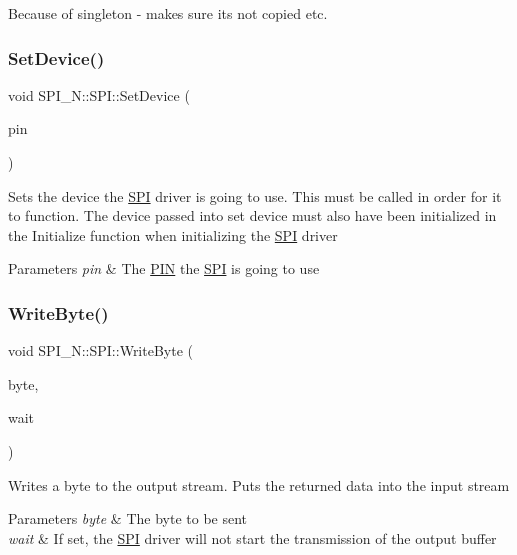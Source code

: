 Because of singleton -\/ makes sure its not copied etc. \hypertarget{class_s_p_i___n_1_1_s_p_i_a23f01675382512e51095ef1d6e257956}{}\label{class_s_p_i___n_1_1_s_p_i_a23f01675382512e51095ef1d6e257956} 
\subsubsection{\texorpdfstring{Set\+Device()}{SetDevice()}}
{\footnotesize\ttfamily void S\+P\+I\+\_\+\+N\+::\+S\+P\+I\+::\+Set\+Device (\begin{DoxyParamCaption}\item[{\hyperlink{struct_s_p_i___n_1_1_p_i_n}{P\+IN}}]{pin }\end{DoxyParamCaption})}

Sets the device the \hyperlink{class_s_p_i___n_1_1_s_p_i}{S\+PI} driver is going to use. This must be called in order for it to function. The device passed into set device must also have been initialized in the Initialize function when initializing the \hyperlink{class_s_p_i___n_1_1_s_p_i}{S\+PI} driver 
\begin{DoxyParams}{Parameters}
{\em pin} & The \hyperlink{struct_s_p_i___n_1_1_p_i_n}{P\+IN} the \hyperlink{class_s_p_i___n_1_1_s_p_i}{S\+PI} is going to use \\
\hline
\end{DoxyParams}
\hypertarget{class_s_p_i___n_1_1_s_p_i_a542dc8e88203de7040ce9926d06b9463}{}\label{class_s_p_i___n_1_1_s_p_i_a542dc8e88203de7040ce9926d06b9463} 
\subsubsection{\texorpdfstring{Write\+Byte()}{WriteByte()}}
{\footnotesize\ttfamily void S\+P\+I\+\_\+\+N\+::\+S\+P\+I\+::\+Write\+Byte (\begin{DoxyParamCaption}\item[{uint8\+\_\+t}]{byte,  }\item[{bool}]{wait }\end{DoxyParamCaption})}

Writes a byte to the output stream. Puts the returned data into the input stream 
\begin{DoxyParams}{Parameters}
{\em byte} & The byte to be sent \\
\hline
{\em wait} & If set, the \hyperlink{class_s_p_i___n_1_1_s_p_i}{S\+PI} driver will not start the transmission of the output buffer \\
\hline
\end{DoxyParams}
\hypertarget{class_s_p_i___n_1_1_s_p_i_a05bcca2e033422b2e6ad570320d03fcb}{}\label{class_s_p_i___n_1_1_s_p_i_a05bcca2e033422b2e6ad570320d03fcb} 
